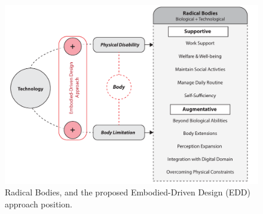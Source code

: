\begin{figure}[b!]
  \centering
  \includegraphics[width=1\linewidth]{figures/intro/RadicalBodies.pdf}
  \captionsetup{justification=centering}
  \caption{Radical Bodies, and the proposed Embodied-Driven Design (EDD) approach position.}
  \label{fig:intro-radicalbodies}
\end{figure}

